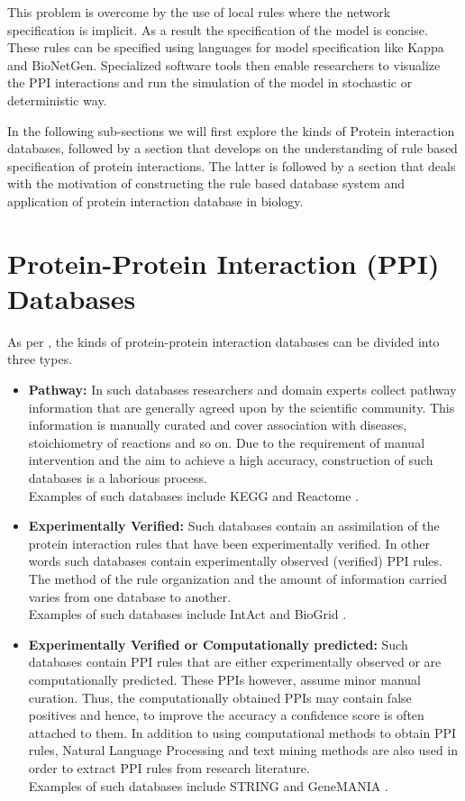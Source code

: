 \documentclass[msc,deptreport,ai]{infthesis}      %
\begin{document}
This problem is overcome by the use of local rules where the network specification is implicit. As a result the specification of the model is concise. These rules can be specified using languages for model specification like Kappa \cite{kappa}  and BioNetGen\cite{bioNetGen}. Specialized software tools then enable researchers to visualize the PPI interactions and run the simulation of the model in stochastic or deterministic way.

In the following sub-sections we will first explore the kinds of Protein interaction databases, followed by a section that develops on the understanding of rule based specification of protein interactions. The latter is followed by a section that deals with the motivation of constructing the rule based database system and application of protein interaction database in biology.

\section{Protein-Protein Interaction (PPI) Databases}
As per \cite{typesOfPPIdb}, the kinds of protein-protein interaction databases can be divided into three types.
\begin{itemize}
	\item
	\textbf{Pathway:} In such databases researchers and domain experts collect pathway information that are generally agreed upon by the scientific community. This information is manually curated and cover association with diseases, stoichiometry of reactions and so on. Due to the requirement of manual intervention and the aim to achieve a high accuracy, construction of such databases is a laborious process.\\ Examples of such databases include KEGG \cite{kegg} and Reactome \cite{reactome}.
	\item
	\textbf{Experimentally Verified: } Such databases contain an assimilation of the protein interaction rules that have been experimentally verified. In other words such databases contain experimentally observed (verified) PPI rules. The method of the rule organization and the amount of information carried varies from one database to another. \\Examples of such databases include IntAct \cite{intact} and BioGrid \cite{biogrid}.
	\item
	\textbf{Experimentally Verified or Computationally predicted: } Such databases contain PPI rules that are either experimentally observed or are computationally predicted. These PPIs however, assume minor manual curation. Thus, the computationally obtained PPIs may contain false positives and hence, to improve the accuracy a confidence score is often attached to them. In addition to using computational methods to obtain PPI rules, Natural Language Processing and text mining methods are also used in order to extract PPI rules from research literature.\\  Examples of such databases include  STRING \cite{string} and GeneMANIA \cite{genemania}.
\end{itemize}
\end{document}
